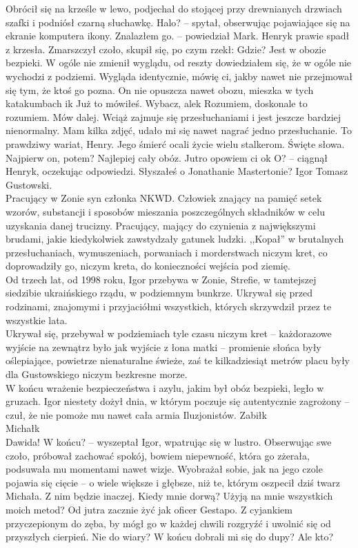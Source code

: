 \documentclass[../MAIN.tex]{subfiles}
\begin{document}
Obrócił się na krześle w lewo, podjechał do stojącej przy drewnianych drzwiach szafki i podniósł czarną słuchawkę.
\sx Halo? -- spytał, obserwując pojawiające się na ekranie komputera ikony.
\xx Znalazłem go. -- powiedział Mark.
\qd
Henryk prawie spadł z krzesła. Zmarszczył czoło, skupił się, po czym rzekł:
\sx Gdzie?
\xx Jest w obozie bezpieki. W ogóle nie zmienił wyglądu, od reszty dowiedziałem się, że w ogóle nie wychodzi z podziemi. Wygląda identycznie, mówię ci, jakby nawet nie przejmował się tym, że ktoś go pozna. On nie opuszcza nawet obozu, mieszka w tych katakumbach i\3k
\xx Już to mówiłeś.
\xx Wybacz, ale\3k
\xx Rozumiem, doskonale to rozumiem. Mów dalej.
\xx Wciąż zajmuje się przesłuchaniami i jest jeszcze bardziej nienormalny. Mam kilka zdjęć, udało mi się nawet nagrać jedno przesłuchanie. To prawdziwy wariat, Henry. Jego śmierć ocali życie wielu stalkerom.
\xx Święte słowa. Najpierw on, potem?
\xx Najlepiej cały obóz. Jutro opowiem ci o\3k
\xx O? -- ciągnął Henryk, oczekując odpowiedzi.
\xx Słyszałeś o Jonathanie Mastertonie?
\qd
% 
% 
Igor Tomasz Gustowski.\\
Pracujący w Zonie syn członka NKWD. Człowiek znający na pamięć setek wzorów, substancji i sposobów mieszania poszczególnych składników w celu uzyskania danej trucizny. Pracujący, mający do czynienia z największymi brudami, jakie kiedykolwiek zawstydzały gatunek ludzki. ,,Kopał'' w brutalnych przesłuchaniach, wymuszeniach, porwaniach i morderstwach niczym kret, co doprowadziły go, niczym kreta, do konieczności wejścia pod ziemię.\\
Od trzech lat, od 1998 roku, Igor przebywa w Zonie, Strefie, w tamtejszej siedzibie ukraińskiego rządu, w podziemnym bunkrze. Ukrywał się przed rodzinami, znajomymi i przyjaciółmi wszystkich, których skrzywdził przez te wszystkie lata.\\
Ukrywał się, przebywał w podziemiach tyle czasu niczym kret -- każdorazowe wyjście na zewnątrz było jak wyjście z łona matki -- promienie słońca były oślepiające, powietrze nienaturalne świeże, zaś te kilkadziesiąt metrów placu były dla Gustowskiego niczym bezkresne morze.\\
W końcu wrażenie bezpieczeństwa i azylu, jakim był obóz bezpieki, legło w gruzach. Igor niestety dożył dnia, w którym poczuje się autentycznie zagrożony -- czuł, że nie pomoże mu nawet cała armia Iluzjonistów.
\swk[5em]
Zabił\3k\\
Michał\3k\\
Dawida!
\qwk
\sx W końcu? -- wyszeptał Igor, wpatrując się w lustro. Obserwując swe czoło, próbował zachować spokój, bowiem niepewność, która go zżerała, podsuwała mu momentami nawet wizje. Wyobrażał sobie, jak na jego czole pojawia się cięcie -- o wiele większe i głębsze, niż te, którym oszpecił dziś twarz Michała. Z nim będzie inaczej.
\xx Kiedy mnie dorwą? Użyją na mnie wszystkich moich metod?
\qd
Od jutra zacznie żyć jak oficer Gestapo. Z cyjankiem przyczepionym do zęba, by mógł go w każdej chwili rozgryźć i uwolnić się od przyszłych cierpień.
\sx Nie do wiary? W końcu dobrali mi się do dupy?
Ale kto?
\qd
\end{document}
